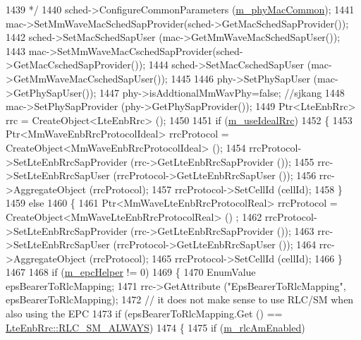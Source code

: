 \begin{DoxyCode}
1439 \textcolor{comment}{        */}
1440         sched->ConfigureCommonParameters (\hyperlink{classns3_1_1MmWaveHelper_a6aaa35de743b9a88998de0128b1046b4}{m\_phyMacCommon});
1441         mac->SetMmWaveMacSchedSapProvider(sched->GetMacSchedSapProvider());
1442         sched->SetMacSchedSapUser (mac->GetMmWaveMacSchedSapUser());
1443         mac->SetMmWaveMacCschedSapProvider(sched->GetMacCschedSapProvider());
1444         sched->SetMacCschedSapUser (mac->GetMmWaveMacCschedSapUser());
1445 
1446         phy->SetPhySapUser (mac->GetPhySapUser());
1447         phy->isAddtionalMmWavPhy=\textcolor{keyword}{false}; \textcolor{comment}{//sjkang}
1448         mac->SetPhySapProvider (phy->GetPhySapProvider());
1449         Ptr<LteEnbRrc> rrc = CreateObject<LteEnbRrc> ();
1450 
1451         \textcolor{keywordflow}{if} (\hyperlink{classns3_1_1MmWaveHelper_ad41fdb2996a6f53385b146bb60f476dc}{m\_useIdealRrc})
1452         \{
1453                 Ptr<MmWaveEnbRrcProtocolIdeal> rrcProtocol = CreateObject<MmWaveEnbRrcProtocolIdeal> ();
1454                 rrcProtocol->SetLteEnbRrcSapProvider (rrc->GetLteEnbRrcSapProvider ());
1455                 rrc->SetLteEnbRrcSapUser (rrcProtocol->GetLteEnbRrcSapUser ());
1456                 rrc->AggregateObject (rrcProtocol);
1457                 rrcProtocol->SetCellId (cellId);
1458         \}
1459         \textcolor{keywordflow}{else}
1460         \{
1461                 Ptr<MmWaveLteEnbRrcProtocolReal> rrcProtocol = CreateObject<MmWaveLteEnbRrcProtocolReal> ()
      ;
1462                 rrcProtocol->SetLteEnbRrcSapProvider (rrc->GetLteEnbRrcSapProvider ());
1463                 rrc->SetLteEnbRrcSapUser (rrcProtocol->GetLteEnbRrcSapUser ());
1464                 rrc->AggregateObject (rrcProtocol);
1465                 rrcProtocol->SetCellId (cellId);
1466         \}
1467 
1468         \textcolor{keywordflow}{if} (\hyperlink{classns3_1_1MmWaveHelper_a03b33f9a2480a4cdd8ffe697ccc08e9e}{m\_epcHelper} != 0)
1469         \{
1470                 EnumValue epsBearerToRlcMapping;
1471                 rrc->GetAttribute (\textcolor{stringliteral}{"EpsBearerToRlcMapping"}, epsBearerToRlcMapping);
1472                 \textcolor{comment}{// it does not make sense to use RLC/SM when also using the EPC}
1473                 \textcolor{keywordflow}{if} (epsBearerToRlcMapping.Get () == \hyperlink{classns3_1_1LteEnbRrc_a1c748bf2d69860b866dfda2a38427842aacda149c15c085eb654d411b64f62770}{LteEnbRrc::RLC\_SM\_ALWAYS})
1474                 \{
1475                         \textcolor{keywordflow}{if} (\hyperlink{classns3_1_1MmWaveHelper_a47e5d8166922f0be28d1e29e18d2e1f9}{m\_rlcAmEnabled})

\end{DoxyCode}
